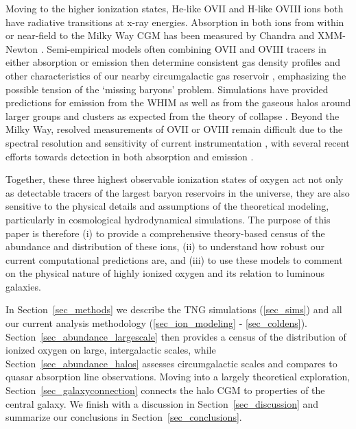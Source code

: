 \documentclass[useAMS,usenatbib]{mnras}
\newcommand{\ovii}{OVII\xspace}
\newcommand{\oviii}{OVIII\xspace}
\begin{document}
Moving to the higher ionization states, \mbox{He-like} \ovii and \mbox{H-like} \oviii ions both have radiative transitions at x-ray energies. Absorption in both ions from within or near-field to the Milky Way CGM has been measured by Chandra \citep{nicastro02} and XMM-Newton \citep{rasmussen03,bregman07b}. Semi-empirical models often combining \ovii and \oviii tracers in either absorption or emission then determine consistent gas density profiles and other characteristics of our nearby circumgalactic gas reservoir \citep{miller15,li17,faerman17}, emphasizing the possible tension of the `missing baryons' problem.  Simulations have provided predictions for emission from the WHIM as well as from the gaseous halos around larger groups and clusters \citep{kravtsov02,yoshikawa03,fang05,bertone10a} as expected from the theory of collapse \citep{silk77,wr78}. Beyond the Milky Way, resolved measurements of \ovii or \oviii remain difficult due to the spectral resolution and sensitivity of current instrumentation \cite[see review in][]{bregman07}, with several recent efforts towards detection in both absorption \citep[e.g.][]{buote09,williams13} and emission \citep{pinto14}. 

Together, these three highest observable ionization states of oxygen act not only as detectable tracers of the largest baryon reservoirs in the universe, they are also sensitive to the physical details and assumptions of the theoretical modeling, particularly in cosmological hydrodynamical simulations. The purpose of this paper is therefore (i) to provide a comprehensive theory-based census of the abundance and distribution of these ions, (ii) to understand how robust our current computational predictions are, and (iii) to use these models to comment on the physical nature of highly ionized oxygen and its relation to luminous galaxies.

In Section~\ref{sec_methods} we describe the TNG simulations (\ref{sec_sims}) and all our current analysis methodology (\ref{sec_ion_modeling} - \ref{sec_coldens}). Section~\ref{sec_abundance_largescale} then provides a census of the distribution of ionized oxygen on large, intergalactic scales, while Section~\ref{sec_abundance_halos} assesses circumgalactic scales and compares to quasar absorption line observations. Moving into a largely theoretical exploration, Section~\ref{sec_galaxyconnection} connects the halo CGM to properties of the central galaxy. We finish with a discussion in Section~\ref{sec_discussion} and summarize our conclusions in Section~\ref{sec_conclusions}.
\end{document}
